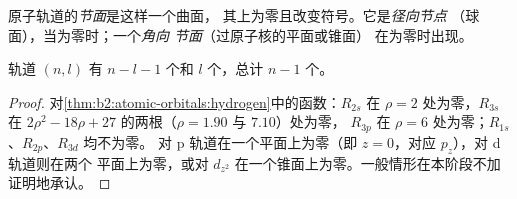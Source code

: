 \begin{definition}[节点]\label{def:b2:atomic-orbitals:node}
原子轨道的\emph{节面}是这样一个曲面，
其上为零且改变符号。它是\emph{径向节点}
（球面），当为零时；一个\emph{角向
节面}（过原子核的平面或锥面）
在为零时出现。
\end{definition}

\begin{proposition}[节点计数]\label{prop:b2:atomic-orbitals:nodes}
轨道 $(n, l)$ 有 $n - l - 1$ 个和 $l$ 个，总计
$n - 1$ 个。
\end{proposition}

\begin{proof}
对\cref{thm:b2:atomic-orbitals:hydrogen}中的函数：$R_{2s}$ 在
$\rho = 2$ 处为零，$R_{3s}$ 在 $2\rho^2 - 18\rho + 27$ 的两根（$\rho = 1.90$ 与 $7.10$）处为零，
$R_{3p}$ 在 $\rho = 6$ 处为零；$R_{1s}$、$R_{2p}$、$R_{3d}$ 均不为零。
对 p 轨道在一个平面上为零（即 $z = 0$，对应 $p_z$），对 d 轨道则在两个
平面上为零，或对 $d_{z^2}$ 在一个锥面上为零。一般情形在本阶段不加证明地承认。
\end{proof}

